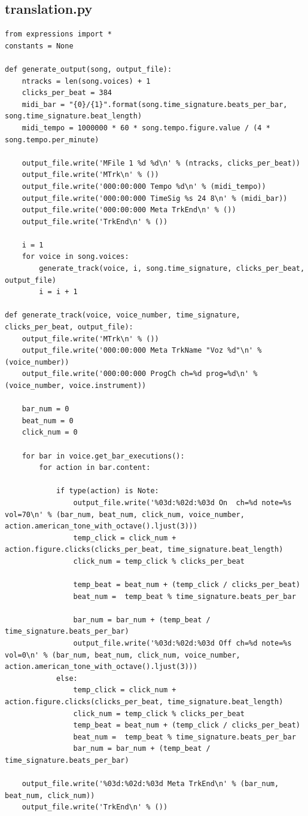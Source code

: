 \documentclass[a4paper, 10pt, twoside]{article}
\begin{document}
\subsection{translation.py}
\begin{verbatim}
from expressions import *
constants = None

def generate_output(song, output_file):
    ntracks = len(song.voices) + 1
    clicks_per_beat = 384
    midi_bar = "{0}/{1}".format(song.time_signature.beats_per_bar, song.time_signature.beat_length)
    midi_tempo = 1000000 * 60 * song.tempo.figure.value / (4 * song.tempo.per_minute)
    
    output_file.write('MFile 1 %d %d\n' % (ntracks, clicks_per_beat))
    output_file.write('MTrk\n' % ())
    output_file.write('000:00:000 Tempo %d\n' % (midi_tempo))
    output_file.write('000:00:000 TimeSig %s 24 8\n' % (midi_bar))    
    output_file.write('000:00:000 Meta TrkEnd\n' % ())
    output_file.write('TrkEnd\n' % ())
    
    i = 1
    for voice in song.voices:
        generate_track(voice, i, song.time_signature, clicks_per_beat, output_file)
        i = i + 1

def generate_track(voice, voice_number, time_signature, clicks_per_beat, output_file):
    output_file.write('MTrk\n' % ())
    output_file.write('000:00:000 Meta TrkName "Voz %d"\n' % (voice_number))
    output_file.write('000:00:000 ProgCh ch=%d prog=%d\n' % (voice_number, voice.instrument))
    
    bar_num = 0
    beat_num = 0
    click_num = 0

    for bar in voice.get_bar_executions():
        for action in bar.content:
            
            if type(action) is Note:
                output_file.write('%03d:%02d:%03d On  ch=%d note=%s vol=70\n' % (bar_num, beat_num, click_num, voice_number, action.american_tone_with_octave().ljust(3)))
                temp_click = click_num + action.figure.clicks(clicks_per_beat, time_signature.beat_length)
                click_num = temp_click % clicks_per_beat
                
                temp_beat = beat_num + (temp_click / clicks_per_beat)
                beat_num =  temp_beat % time_signature.beats_per_bar
                
                bar_num = bar_num + (temp_beat / time_signature.beats_per_bar)
                output_file.write('%03d:%02d:%03d Off ch=%d note=%s vol=0\n' % (bar_num, beat_num, click_num, voice_number, action.american_tone_with_octave().ljust(3)))
            else:
                temp_click = click_num + action.figure.clicks(clicks_per_beat, time_signature.beat_length)
                click_num = temp_click % clicks_per_beat                
                temp_beat = beat_num + (temp_click / clicks_per_beat)
                beat_num =  temp_beat % time_signature.beats_per_bar                
                bar_num = bar_num + (temp_beat / time_signature.beats_per_bar)
    
    output_file.write('%03d:%02d:%03d Meta TrkEnd\n' % (bar_num, beat_num, click_num))
    output_file.write('TrkEnd\n' % ())

\end{verbatim}
\end{document}
